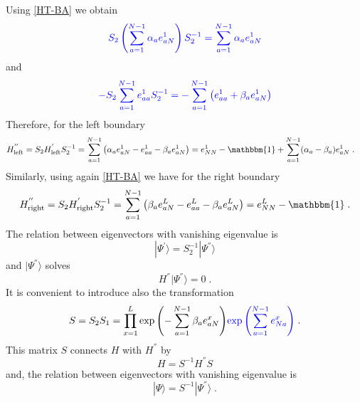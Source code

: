 \documentclass[10pt]{article}
\numberwithin{equation}{section}
\numberwithin{equation}{subsection}
\newcommand{\dt}{\;.}
\newcommand{\fra}[1]{\textcolor[rgb]{0,0,1}{#1}}
\begin{document}
\fra{Using \eqref{HT-BA} we obtain}
\begin{align}
	\fra{S_{2}\left(\sum_{a=1}^{N-1}\alpha_{a}e_{aN}^{1}\right)S_{2}^{-1}=\sum_{a=1}^{N-1}\alpha_{a}e_{aN}^{1}}
\end{align}
\fra{and}
\begin{align}
\fra{-S_{2}\sum_{a=1}^{N-1}e_{aa}^{1}S_{2}^{-1}=-\sum_{a=1}^{N-1}\left(e_{aa}^{1}+\beta_{a}e_{aN}^{1}\right)}
\end{align}
\fra{Therefore,  for the left boundary} 
\begin{equation}
	\begin{split}
		H_{\text{left}}^{''}&=S_{2}H_{\text{left}}^{'}S_{2}^{-1}
		=
		\sum_{a=1}^{N-1}\left(\alpha_{a}e_{aN}^{1}-e_{aa}^{1}-\beta_{a}e_{aN}^{1}\right)
		=
		e_{NN}^{1}-\mathbbm{1}+\sum_{a=1}^{N-1}(\alpha_{a}-\beta_{a})e_{aN}^{1}\dt
	\end{split}
\end{equation}
Similarly, using again \eqref{HT-BA} we have for the right boundary 
\begin{equation}
	\begin{split}
			H_{\text{right}}^{''}=S_{2}H_{\text{right}}^{'}S_{2}^{-1}
			=
			\sum_{a=1}^{N-1}\left(\beta_{a}e_{aN}^{L}-e_{aa}^{L}-\beta_{a}e_{aN}^{L}\right)=
			e_{NN}^{L}-\mathbbm{1}\dt
	\end{split}
\end{equation}
The relation between eigenvectors with vanishing eigenvalue is 
\begin{equation}\label{S2-Inverse}
	|\Psi^{'}\rangle = S_{2}^{-1}|\Psi^{''}\rangle
\end{equation}
and $|\Psi^{''}\rangle$ solves
\begin{equation}\label{steadyS-SECOND-def}
	H^{''}|\Psi^{''}\rangle=0\dt
\end{equation}
It is convenient to introduce also the transformation
\begin{equation}\label{similarity}
	S=S_{2}S_{1}=\prod_{x=1}^{L}\exp{\left(-\sum_{a=1}^{N-1}\beta_{a}e_{aN}^{x}\right)}\fra{\exp{\left(\sum_{a=1}^{N-1}e_{Na}^{x}\right)}}\dt
\end{equation}
This matrix $S$ connects $H$ with $H^{''}$ by 
\begin{equation}
H=S^{-1}H^{''}S
\end{equation}
and, the relation between eigenvectors with vanishing eigenvalue is
\begin{equation}
	|\Psi\rangle=S^{-1}|\Psi^{''}\rangle\dt
\end{equation}
\end{document}
